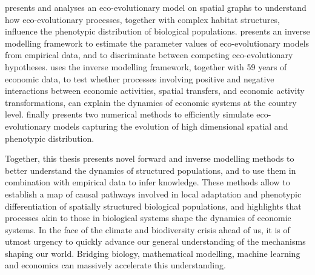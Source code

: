 {\Cref{\chapi} presents and analyses an eco-evolutionary model on spatial graphs to understand how eco-evolutionary processes, together with complex habitat structures, influence the phenotypic distribution of biological populations. \Cref{\chapii} presents an inverse modelling framework to estimate the parameter values of eco-evolutionary models from empirical data, and to discriminate between competing eco-evolutionary hypotheses. \Cref{\chapiv} uses the inverse modelling framework, together with 59 years of economic data, to test whether processes involving positive and negative interactions between economic activities, spatial transfers, and economic activity transformations, can explain the dynamics of economic systems at the country level. \Cref{\chapiv} finally presents two numerical methods to efficiently simulate eco-evolutionary models capturing the evolution of high dimensional spatial and phenotypic distribution.

Together, this thesis presents novel forward and inverse modelling methods to better understand the dynamics of structured populations, and to use them in combination with empirical data to infer knowledge. These methods allow to establish a map of causal pathways involved in local adaptation and phenotypic differentiation of spatially structured biological populations, and highlights that processes akin to those in biological systems shape the dynamics of economic systems. 
% 
In the face of the climate and biodiversity crisis ahead of us, it is of utmost urgency to quickly advance our general understanding of the mechanisms shaping our world.
% 
Bridging biology, mathematical modelling, machine learning and economics can massively accelerate this understanding.
}





